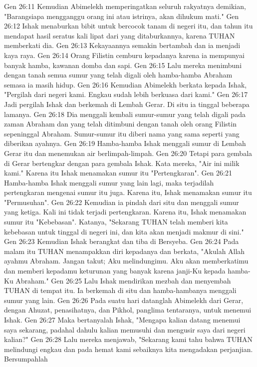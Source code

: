 Gen 26:11  Kemudian Abimelekh memperingatkan seluruh rakyatnya demikian, "Barangsiapa mengganggu orang ini atau istrinya, akan dihukum mati."
Gen 26:12  Ishak menaburkan bibit untuk bercocok tanam di negeri itu, dan tahun itu mendapat hasil seratus kali lipat dari yang ditaburkannya, karena TUHAN memberkati dia.
Gen 26:13  Kekayaannya semakin bertambah dan ia menjadi kaya raya.
Gen 26:14  Orang Filistin cemburu kepadanya karena ia mempunyai banyak hamba, kawanan domba dan sapi.
Gen 26:15  Lalu mereka menimbuni dengan tanah semua sumur yang telah digali oleh hamba-hamba Abraham semasa ia masih hidup.
Gen 26:16  Kemudian Abimelekh berkata kepada Ishak, "Pergilah dari negeri kami. Engkau sudah lebih berkuasa dari kami."
Gen 26:17  Jadi pergilah Ishak dan berkemah di Lembah Gerar. Di situ ia tinggal beberapa lamanya.
Gen 26:18  Dia menggali kembali sumur-sumur yang telah digali pada zaman Abraham dan yang telah ditimbuni dengan tanah oleh orang Filistin sepeninggal Abraham. Sumur-sumur itu diberi nama yang sama seperti yang diberikan ayahnya.
Gen 26:19  Hamba-hamba Ishak menggali sumur di Lembah Gerar itu dan menemukan air berlimpah-limpah.
Gen 26:20  Tetapi para gembala di Gerar bertengkar dengan para gembala Ishak. Kata mereka, "Air ini milik kami." Karena itu Ishak menamakan sumur itu "Pertengkaran".
Gen 26:21  Hamba-hamba Ishak menggali sumur yang lain lagi, maka terjadilah pertengkaran mengenai sumur itu juga. Karena itu, Ishak menamakan sumur itu "Permusuhan".
Gen 26:22  Kemudian ia pindah dari situ dan menggali sumur yang ketiga. Kali ini tidak terjadi pertengkaran. Karena itu, Ishak menamakan sumur itu "Kebebasan". Katanya, "Sekarang TUHAN telah memberi kita kebebasan untuk tinggal di negeri ini, dan kita akan menjadi makmur di sini."
Gen 26:23  Kemudian Ishak berangkat dan tiba di Bersyeba.
Gen 26:24  Pada malam itu TUHAN menampakkan diri kepadanya dan berkata, "Akulah Allah ayahmu Abraham. Jangan takut; Aku melindungimu. Aku akan memberkatimu dan memberi kepadamu keturunan yang banyak karena janji-Ku kepada hamba-Ku Abraham."
Gen 26:25  Lalu Ishak mendirikan mezbah dan menyembah TUHAN di tempat itu. Ia berkemah di situ dan hamba-hambanya menggali sumur yang lain.
Gen 26:26  Pada suatu hari datanglah Abimelekh dari Gerar, dengan Ahuzat, penasihatnya, dan Pikhol, panglima tentaranya, untuk menemui Ishak.
Gen 26:27  Maka bertanyalah Ishak, "Mengapa kalian datang menemui saya sekarang, padahal dahulu kalian memusuhi dan mengusir saya dari negeri kalian?"
Gen 26:28  Lalu mereka menjawab, "Sekarang kami tahu bahwa TUHAN melindungi engkau dan pada hemat kami sebaiknya kita mengadakan perjanjian. Bersumpahlah
